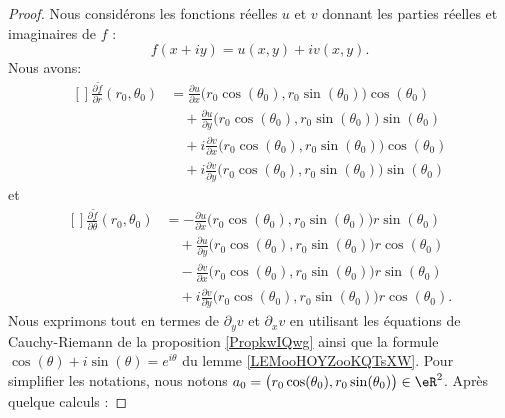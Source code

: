 \begin{proof}
	Nous considérons les fonctions réelles \( u\) et \( v\) donnant les parties réelles et imaginaires de \( f\) :
	\begin{equation}
		f(x+iy)=u(x,y)+iv(x,y).
	\end{equation}
	Nous avons:
	\begin{equation}
		\begin{aligned}[]
			\frac{ \partial \tilde f }{ \partial r }(r_0,\theta_0)
			 & =\frac{ \partial u }{ \partial x }\big( r_0\cos(\theta_0),r_0\sin(\theta_0) \big)\cos(\theta_0)        \\
			 & \quad+\frac{ \partial u }{ \partial y }\big( r_0\cos(\theta_0),r_0\sin(\theta_0) \big)\sin(\theta_0)   \\
			 & \quad+ i\frac{ \partial v }{ \partial x }\big( r_0\cos(\theta_0),r_0\sin(\theta_0) \big)\cos(\theta_0) \\
			 & \quad+ i\frac{ \partial v }{ \partial y }\big( r_0\cos(\theta_0),r_0\sin(\theta_0) \big)\sin(\theta_0)
		\end{aligned}
	\end{equation}
	et
	\begin{equation}
		\begin{aligned}[]
			\frac{ \partial \tilde f }{ \partial \theta }(r_0,\theta_0) & =
			-\frac{ \partial u }{ \partial x }\big( r_0\cos(\theta_0),r_0\sin(\theta_0) \big)r\sin(\theta_0)                                                                      \\
			                                                            & \quad+\frac{ \partial u }{ \partial y }\big( r_0\cos(\theta_0),r_0\sin(\theta_0) \big)r\cos(\theta_0)   \\
			                                                            & \quad-\frac{ \partial v }{ \partial x }\big( r_0\cos(\theta_0),r_0\sin(\theta_0) \big)r\sin(\theta_0)   \\
			                                                            & \quad+i\frac{ \partial v }{ \partial y }\big( r_0\cos(\theta_0),r_0\sin(\theta_0) \big)r\cos(\theta_0).
		\end{aligned}
	\end{equation}
	Nous exprimons tout en termes de \( \partial_yv\) et \( \partial_xv\) en utilisant les équations de Cauchy-Riemann de la proposition \ref{PropkwIQwg} ainsi que la formule \( \cos(\theta)+i\sin(\theta)= e^{i\theta}\) du lemme \ref{LEMooHOYZooKQTsXW}. Pour simplifier les notations, nous notons \( a_0=\big( r_0\cos(\theta_0), r_0\sin(\theta_0) \big)\in \eR^2 \). Après quelque calculs :

\end{proof}
